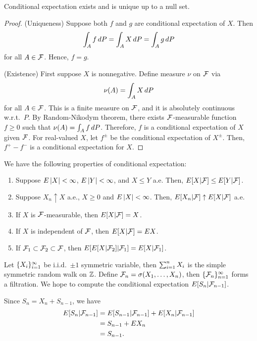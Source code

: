 \documentclass[a4paper]{article}
\begin{document}
\begin{thm}
  Conditional expectation exists and is unique up to a null set.
\end{thm}

\begin{proof}
  (Uniqueness) Suppose both $f$ and $g$ are  
  conditional expectation of $X$. Then 
  \[
  \int_A f \, d P = \int_A X \, d P = \int_A g \, d P
  \]
  for all $A \in \mathcal{F}$. Hence, $f = g$.

  (Existence) First suppose $X$ is nonnegative.
  Define measure $\nu$ on $\mathcal{F}$ via
  \[
    \nu (A) = \int_A X \, d P
  \]
  for all $A \in \mathcal{F}$. This is a finite measure on $\mathcal{F}$, 
  and it is absolutely continuous w.r.t.\ $P$. 
  By Random-Nikodym theorem, there exists $\mathcal{F}$-measurable 
  function $f \geq 0$ such that $\nu (A) = \int_A f \, d P$.
  Therefore, $f$ is a conditional expectation of $X$ given $\mathcal{F}$.
  For real-valued $X$, let $f^\pm$ be the conditional expectation 
  of $X^\pm$. Then, $f^+ - f^-$ is a conditional expectation for $X$.

\end{proof}

\begin{prop}
  We have the following properties of conditional expectation:
  \begin{enumerate}
    \item Suppose $E \left\lvert X\right\rvert < \infty$, $E \left\lvert Y\right\rvert < \infty$, 
    and $X \leq Y$ a.e. Then, $E[X | \mathcal{F}] \leq E[Y | \mathcal{F}]$.

    \item Suppose $X_n \uparrow X$ a.e., $X \geq 0$ and 
    $E \left\lvert X\right\rvert < \infty$. Then, $E [X_n | \mathcal{F}] \uparrow 
    E [X | \mathcal{F}]$ a.e.

    \item If $X$ is $\mathcal{F}$-measurable, then $E [X | \mathcal{F}]
    = X$.

    \item If $X$ is independent of $\mathcal{F}$, then 
    $E [X | \mathcal{F}] = E X$.

    \item If $\mathcal{F}_1 \subset \mathcal{F}_2 \subset \mathcal{F}$, then 
    $E[ E[X | \mathcal{F}_2] | \mathcal{F}_1] = E [X | \mathcal{F}_1]$.
    
  \end{enumerate}
\end{prop}

\begin{eg}
  Let $\{ X_i \}_{i=1}^\infty$ be i.i.d.\ $\pm 1$ symmetric variable,
  then $\sum_{i=1}^n X_i$ is the simple symmetric random walk on $\mathbb{Z}$.
  Define $\mathcal{F}_n = \sigma (X_1, \dots, X_n)$, then 
  $\{ \mathcal{F}_n \}_{n=1}^\infty$ forms a filtration. We hope to compute 
  the conditional expectation $E [S_n | \mathcal{F}_{n - 1}]$.

  Since $S_n = X_n + S_{n - 1}$, we have 
  \begin{align*}
    E[S_n | \mathcal{F}_{n - 1}]
    &= E[S_{n - 1} | \mathcal{F}_{n - 1}] + E[X_n | \mathcal{F}_{n - 1}] \\
    &= S_{n - 1} + E X_n \\
    &= S_{n - 1}.
  \end{align*}

\end{eg}
\end{document}
